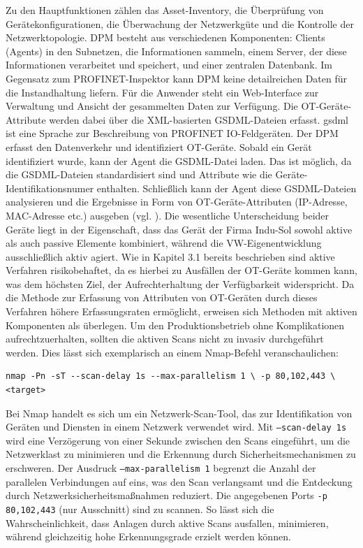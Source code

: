 Zu den Hauptfunktionen zählen das Asset-Inventory, die Überprüfung von Gerätekonfigurationen, die Überwachung der Netzwerkgüte und die Kontrolle der Netzwerktopologie. DPM besteht aus verschiedenen Komponenten: Clients (Agents) in den Subnetzen, die Informationen sammeln, einem Server, der diese Informationen verarbeitet und speichert, und einer zentralen Datenbank. Im Gegensatz zum PROFINET-Inspektor kann DPM keine detailreichen Daten für die Instandhaltung liefern. Für die Anwender steht ein Web-Interface zur Verwaltung und Ansicht der gesammelten Daten zur Verfügung. Die OT-Geräte-Attribute werden dabei über die XML-basierten GSDML-Dateien erfasst.  \ac{gsdml} ist eine Sprache zur Beschreibung von PROFINET IO-Feldgeräten. Der DPM erfasst den Datenverkehr und identifiziert OT-Geräte. Sobald ein Gerät identifiziert wurde, kann der Agent die GSDML-Datei laden. Das ist möglich, da die GSDML-Dateien standardisiert sind und Attribute wie die Geräte-Identifikationsnumer enthalten. Schließlich kann der Agent diese GSDML-Dateien analysieren und die Ergebnisse in Form von OT-Geräte-Attributen (IP-Adresse, MAC-Adresse etc.) ausgeben (vgl. \cite{SIEMENS}). Die wesentliche Unterscheidung beider Geräte liegt in der Eigenschaft, dass das Gerät der Firma Indu-Sol sowohl aktive als auch passive Elemente kombiniert, während die VW-Eigenentwicklung ausschließlich aktiv agiert. Wie in Kapitel 3.1 bereits beschrieben sind aktive Verfahren risikobehaftet, da es hierbei zu Ausfällen der OT-Geräte kommen kann, was dem höchsten Ziel, der Aufrechterhaltung der Verfügbarkeit widerspricht. Da die Methode zur Erfassung von Attributen von OT-Geräten durch dieses Verfahren höhere Erfassungsraten ermöglicht, erweisen sich Methoden mit aktiven Komponenten als überlegen. \clearpage \noindent Um den Produktionsbetrieb ohne Komplikationen aufrechtzuerhalten, sollten die aktiven Scans nicht zu invasiv durchgeführt werden. Dies lässt sich exemplarisch an einem Nmap-Befehl veranschaulichen: 

\bigskip
\begin{verbatim}
nmap -Pn -sT --scan-delay 1s --max-parallelism 1 \ -p 80,102,443 \
<target>
\end{verbatim}
\bigskip

\noindent Bei Nmap handelt es sich um ein Netzwerk-Scan-Tool, das zur Identifikation von Geräten und Diensten in einem Netzwerk verwendet wird. Mit \texttt{--scan-delay 1s} wird eine Verzögerung von einer Sekunde zwischen den Scans eingeführt, um die Netzwerklast zu minimieren und die Erkennung durch Sicherheitsmechanismen zu erschweren. Der Ausdruck \newline \texttt{--max-parallelism 1} begrenzt die Anzahl der parallelen Verbindungen auf eins, was den Scan verlangsamt und die Entdeckung durch Netzwerksicherheitsmaßnahmen reduziert. Die angegebenen Ports \texttt{-p 80,102,443} (nur Ausschnitt) sind zu scannen. So lässt sich die Wahrscheinlichkeit, dass Anlagen durch aktive Scans ausfallen, minimieren, während gleichzeitig hohe Erkennungsgrade erzielt werden können.


